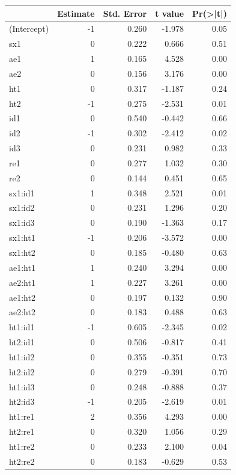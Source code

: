 \documentclass[]{book}
\newenvironment{Shaded}{\begin{snugshade}}{\end{snugshade}}
\newcommand{\KeywordTok}[1]{\textcolor[rgb]{0.13,0.29,0.53}{\textbf{{#1}}}}
\newcommand{\DataTypeTok}[1]{\textcolor[rgb]{0.13,0.29,0.53}{{#1}}}
\newcommand{\DecValTok}[1]{\textcolor[rgb]{0.00,0.00,0.81}{{#1}}}
\newcommand{\OtherTok}[1]{\textcolor[rgb]{0.56,0.35,0.01}{{#1}}}
\newcommand{\NormalTok}[1]{{#1}}
\numberwithin{example}{chapter}
\numberwithin{remark}{chapter}
\numberwithin{definition}{chapter}
\begin{document}
\begin{Shaded}
\end{Shaded}

\begin{tabular}{lrrrr}
\toprule
  & Estimate & Std. Error & t value & Pr(>|t|)\\
\midrule
(Intercept) & -1 & 0.260 & -1.978 & 0.05\\
sx1 & 0 & 0.222 & 0.666 & 0.51\\
ae1 & 1 & 0.165 & 4.528 & 0.00\\
ae2 & 0 & 0.156 & 3.176 & 0.00\\
ht1 & 0 & 0.317 & -1.187 & 0.24\\
\addlinespace
ht2 & -1 & 0.275 & -2.531 & 0.01\\
id1 & 0 & 0.540 & -0.442 & 0.66\\
id2 & -1 & 0.302 & -2.412 & 0.02\\
id3 & 0 & 0.231 & 0.982 & 0.33\\
re1 & 0 & 0.277 & 1.032 & 0.30\\
\addlinespace
re2 & 0 & 0.144 & 0.451 & 0.65\\
sx1:id1 & 1 & 0.348 & 2.521 & 0.01\\
sx1:id2 & 0 & 0.231 & 1.296 & 0.20\\
sx1:id3 & 0 & 0.190 & -1.363 & 0.17\\
sx1:ht1 & -1 & 0.206 & -3.572 & 0.00\\
\addlinespace
sx1:ht2 & 0 & 0.185 & -0.480 & 0.63\\
ae1:ht1 & 1 & 0.240 & 3.294 & 0.00\\
ae2:ht1 & 1 & 0.227 & 3.261 & 0.00\\
ae1:ht2 & 0 & 0.197 & 0.132 & 0.90\\
ae2:ht2 & 0 & 0.183 & 0.488 & 0.63\\
\addlinespace
ht1:id1 & -1 & 0.605 & -2.345 & 0.02\\
ht2:id1 & 0 & 0.506 & -0.817 & 0.41\\
ht1:id2 & 0 & 0.355 & -0.351 & 0.73\\
ht2:id2 & 0 & 0.279 & -0.391 & 0.70\\
ht1:id3 & 0 & 0.248 & -0.888 & 0.37\\
\addlinespace
ht2:id3 & -1 & 0.205 & -2.619 & 0.01\\
ht1:re1 & 2 & 0.356 & 4.293 & 0.00\\
ht2:re1 & 0 & 0.320 & 1.056 & 0.29\\
ht1:re2 & 0 & 0.233 & 2.100 & 0.04\\
ht2:re2 & 0 & 0.183 & -0.629 & 0.53\\
\bottomrule
\end{tabular}
\end{document}
